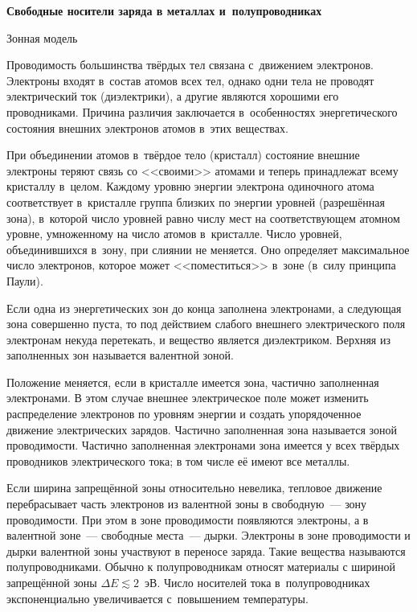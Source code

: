 \documentclass[a4paper,10pt,twoside]{article}
\begin{document}
{\large \bf Свободные носители заряда в металлах и~полупроводниках}

{\large  Зонная модель}

Проводимость большинства твёрдых тел связана с~движением электронов. Электроны входят в~состав атомов всех тел, однако одни тела не проводят электрический ток (диэлектрики), а другие являются хорошими его проводниками. Причина различия заключается в~особенностях энергетического состояния внешних электронов атомов в~этих веществах.

При объединении атомов в~твёрдое тело (кристалл) состояние внешние электроны теряют связь со <<своими>> атомами и теперь принадлежат всему кристаллу в~целом. Каждому уровню энергии электрона одиночного атома соответствует в~кристалле группа близких по энергии уровней (разрешённая зона), в~которой число уровней равно числу мест на соответствующем атомном уровне, умноженному на число атомов в~кристалле. Число уровней, объединившихся в~зону, при слиянии не меняется. Оно определяет максимальное число электронов, которое может <<поместиться>> в~зоне (в~силу принципа Паули).

Если одна из энергетических зон до конца заполнена электронами, а следующая зона совершенно пуста, то под действием слабого внешнего электрического поля электронам некуда перетекать, и вещество является \textsf{диэлектриком}. Верхняя из заполненных зон называется {\textsf{валентной зоной}}.

Положение меняется, если в кристалле имеется зона, частично заполненная электронами. В этом случае внешнее электрическое поле может изменить распределение электронов по уровням энергии и создать упорядоченное движение электрических зарядов. Частично заполненная зона называется \textsf{зоной проводимости}. Частично заполненная электронами зона имеется у всех твёрдых проводников электрического тока; в том числе её имеют все металлы.

Если ширина запрещённой зоны относительно невелика, тепловое движение перебрасывает часть электронов из валентной зоны в свободную~--- зону проводимости. При этом в зоне проводимости появляются электроны, а в валентной зоне~--- свободные места~--- \textsf{дырки}. Электроны в зоне проводимости и дырки валентной зоны участвуют в переносе заряда. Такие вещества называются \textsf{полупроводниками}. Обычно к полупроводникам относят материалы с шириной запрещённой зоны $\Delta E \lesssim 2$~эВ. Число носителей тока в~полупроводниках экспоненциально увеличивается с~повышением температуры.
\end{document}
